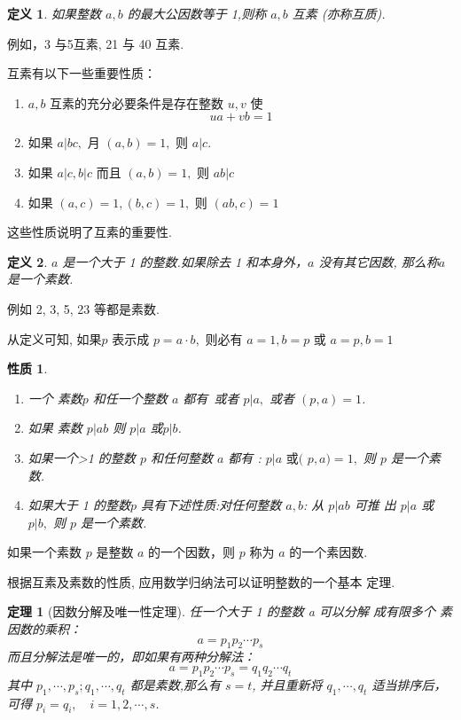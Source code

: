 \documentclass[13pt,fontset=mac]{ctexbeamer}
\newtheorem{thm}{定理}
\newtheorem*{defi}{定义}
\newtheorem*{prop}{性质}
\begin{document}
\begin{frame}
\begin{defi}
	如果整数 $a, b$ 的最大公因数等于 1,则称 $a, b$ \alert{互素} (亦称互质).
\end{defi}
例如，3 与5互素, 21 与 40 互素.

互素有以下一些重要性质：
\begin{enumerate}
\item $a ,b$ 互素的充分必要条件是存在整数 $u, v$ 使
\[
u a+v b=1
\]
\item 如果 $a | b c,$ 月 $(a, b)=1,$ 则 $a | c$.
\item 如果 $a|c, b| c$ 而且 $(a, b)=1,$ 则 $a b | c$
\item 如果 $(a, c)=1,(b, c)=1,$ 则 $(a b, c)=1$
\end{enumerate}
这些性质说明了互素的重要性. 
\end{frame}


 
 \begin{frame}


\begin{defi}
	$a$ 是一个大于 1 的整数.如果除去 1 和本身外，$a$ 没有其它因数, 那么称$a$是一个\alert{素数}.
\end{defi}
例如 2, 3, 5, 23 等都是素数.  

从定义可知, 如果$p$ 表示成 $p=a \cdot b,$ 则必有 $a=1, b=p$ 或 $a=p, b=1$ 

\begin{prop}
\begin{enumerate}
\item  一个 素数$p$ 和任一个整数 $a$ 都有~或者 $p | a,$ 或者 $(p, a)=1$.
\item 如果 素数 $p | a  b$ 则 $p | a$ 或$p| b$.
\item  如果一个>1 的整数 $p$ 和任何整数 $a$ 都有 : $p | a \text { 或( } p, a)=1,$ 则 $p$
是一个素数.
\item 如果大于 1 的整数$p$ 具有下述性质:对任何整数 $a , b$: 从 $p | a b$ 可推 出 $p | a$ 或 $p | b,$ 则 $p$ 是一个素数.  
\end{enumerate}
\end{prop}
如果一个素数  $p$ 是整数 $a$ 的一个因数，则 $p$ 称为 $a$ 的一个素因数.
 \end{frame}


 \begin{frame}
根据互素及素数的性质, 应用数学归纳法可以证明整数的一个基本
定理. 
\begin{thm}[因数分解及唯一性定理]
任一个大于 1 的整数 a 可以分解 成有限多个 素因数的乘积：
\[
a=p_{1} p_{2} \cdots p_{s}
\]
而且分解法是唯一的，即如果有两种分解法：
\[
a=p_{1} p_{2} \cdots p_{s}= q_{1} q_{2} \cdots q_{t}
\]
其中 $p_{1}, \cdots, p_{s} ; q_{1}, \cdots, q_{t}$ 都是素数,那么有 $s=t$,  并且重新将 $q_{1}, \cdots, q_{t}$ 适当排序后，可得
$p_{i}=q_{i}, \quad i=1,2, \cdots, s$.
\end{thm}
\end{frame}
\end{document}
